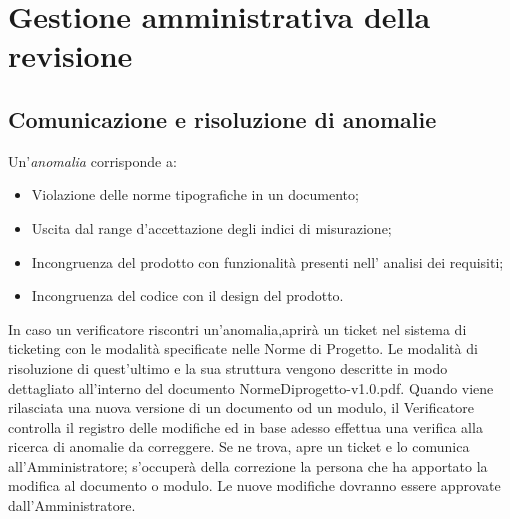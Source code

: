 \section{Gestione amministrativa della revisione}


\subsection{Comunicazione e risoluzione di anomalie}

Un'\textit{anomalia} corrisponde a:
\begin{itemize}
	\item Violazione delle norme tipografiche in un documento;
	\item Uscita dal range d'accettazione degli indici di misurazione;
	\item Incongruenza del prodotto con funzionalità presenti nell' analisi dei requisiti;
	\item Incongruenza del codice con il design del prodotto.
\end{itemize}

In caso un verificatore riscontri un'anomalia,aprirà un ticket nel sistema di ticketing con le modalità specificate nelle Norme di Progetto.
Le modalità di risoluzione di quest'ultimo e la sua struttura vengono descritte in modo dettagliato all'interno del documento NormeDiprogetto-v1.0.pdf.
Quando viene rilasciata una nuova versione di un documento od un modulo, il Verificatore controlla il registro delle modifiche ed in base adesso effettua una verifica alla ricerca di anomalie da correggere. Se ne trova, apre un ticket e lo comunica all'Amministratore; s'occuperà della correzione la persona che ha apportato la modifica al documento o modulo. Le nuove modifiche dovranno essere approvate dall'Amministratore.